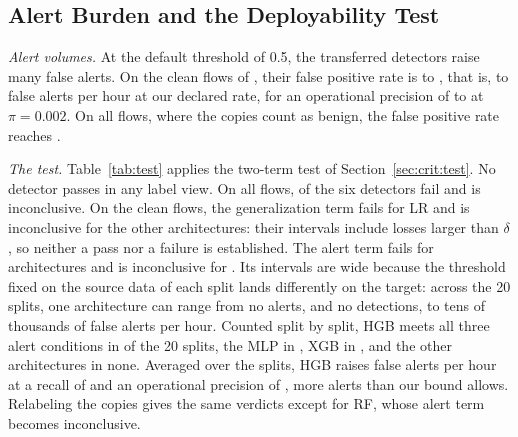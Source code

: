 \subsection{Alert Burden and the Deployability Test}
\label{sec:res:alerts}

\emph{Alert volumes.} At the default threshold of 0.5, the transferred detectors raise many false alerts. On the clean flows of \DB{}, their false positive rate is \ROpBCleanFPRmin{} to \ROpBCleanFPRmax, that is, \ROpBCleanAlertsMin{} to \ROpBCleanAlertsMax{} false alerts per hour at our declared rate, for an operational precision of \ROpBCleanPPVmin{} to \ROpBCleanPPVmax{} at $\pi = 0.002$. On all flows, where the copies count as benign, the false positive rate reaches \ROpBAllFPRmax.

\emph{The test.} Table~\ref{tab:test} applies the two-term test of Section~\ref{sec:crit:test}. No detector passes in any label view. On all flows, \RTestAllFailN{} of the six detectors fail and \RTestAllInconclusiveN{} is inconclusive. On the clean flows, the generalization term fails for LR and is inconclusive for the other \RTestCleanGenInconclusiveN{} architectures: their intervals include losses larger than $\delta$, so neither a pass nor a failure is established. The alert term fails for \RTestCleanAlertFailN{} architectures and is inconclusive for \RTestCleanAlertInconclusiveN{}. Its intervals are wide because the threshold fixed on the source data of each split lands differently on the target: across the 20 splits, one architecture can range from no alerts, and no detections, to tens of thousands of false alerts per hour. Counted split by split, HGB meets all three alert conditions in \RJointHGBClean{} of the 20 splits, the MLP in \RJointMLPClean{}, XGB in \RJointXGBClean{}, and the other architectures in none. Averaged over the splits, HGB raises \RTestHGBCleanAlerts{} false alerts per hour at a recall of \RTestHGBCleanRecall{} and an operational precision of \RTestHGBCleanPPV{}, more alerts than our bound allows. Relabeling the copies gives the same verdicts except for RF, whose alert term becomes inconclusive.

\begin{table}[t]
\caption{Two-term deployability test (Section~\ref{sec:crit:test}) for transfer from \DA{} to \DB{}, 20 splits. Generalization: $\Delta_{\mathrm{BA}}$ with its Nadeau--Bengio corrected 95\% interval; pass if the upper bound is at most $\delta = 0.10$, fail if the lower bound exceeds it. Alert burden at the threshold fixed on each split's held-out source data (recall at least 0.5 there): mean recall, false alerts per hour at $\lambda_b = 240{,}000$ benign flows per hour, and operational precision at $\pi = 0.002$, with corrected intervals; pass if all three intervals lie on the passing side of $r_{\min} = 0.5$, $A_{\max} = 200$, and $\rho = 0.1$, fail if any lies on the failing side. Splits: splits in which all three alert conditions hold. $\checkmark$: pass, $\times$: fail, ?: inconclusive; $\mathcal{P}$: verdict. The bounds are our own, not operator requirements.}
\label{tab:test}
\centering
\scriptsize
\setlength{\tabcolsep}{3pt}

\end{table}

